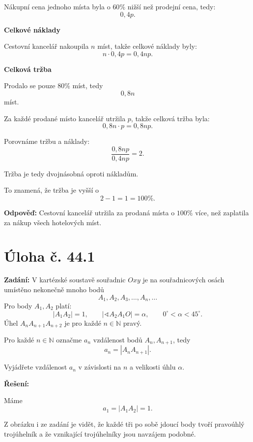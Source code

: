 \documentclass[12pt,a4paper]{article}
\begin{document}
Nákupní cena jednoho místa byla o \(60\%\) nižší než prodejní cena, tedy:
\[
0{,}4p.
\]

\medskip

\textbf{Celkové náklady}

Cestovní kancelář nakoupila \(n\) míst, takže celkové náklady byly:
\[
n \cdot 0{,}4p = 0{,}4np.
\]

\medskip

\textbf{Celková tržba}

Prodalo se pouze \(80\%\) míst, tedy
\[
0{,}8n
\]
míst.

Za každé prodané místo kancelář utržila \(p\), takže celková tržba byla:
\[
0{,}8n \cdot p = 0{,}8np.
\]

\medskip

Porovnáme tržbu a náklady:
\[
\frac{0{,}8np}{0{,}4np}=2.
\]

Tržba je tedy dvojnásobná oproti nákladům.

To znamená, že tržba je vyšší o
\[
2-1=1=100\%.
\]

\bigskip

\textbf{Odpověď:}  
Cestovní kancelář utržila za prodaná místa o \(100\%\) více, než zaplatila za nákup všech hotelových míst.



\newpage
\section*{Úloha č. 44.1}

\textbf{Zadání:}  
V kartézské soustavě souřadnic \(Oxy\) je na souřadnicových osách umístěno nekonečně mnoho bodů
\[
A_1,A_2,A_3,\dots,A_n,\dots
\]
Pro body \(A_1,A_2\) platí:
\[
|A_1A_2|=1,\qquad |\sphericalangle A_2A_1O|=\alpha,\qquad 0^\circ<\alpha<45^\circ.
\]
Úhel \(A_nA_{n+1}A_{n+2}\) je pro každé \(n\in\mathbb{N}\) pravý.

Pro každé \(n\in\mathbb{N}\) označme \(a_n\) vzdálenost bodů \(A_n,A_{n+1}\), tedy
\[
a_n=|A_nA_{n+1}|.
\]

Vyjádřete vzdálenost \(a_n\) v závislosti na \(n\) a velikosti úhlu \(\alpha\).

\bigskip

\textbf{Řešení:}

Máme
\[
a_1=|A_1A_2|=1.
\]

Z obrázku i ze zadání je vidět, že každé tři po sobě jdoucí body tvoří pravoúhlý trojúhelník a že vznikající trojúhelníky jsou navzájem podobné.
\end{document}
